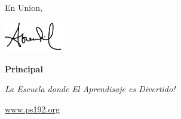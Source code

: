 \documentclass[12pt,letterpaper]{article}
\begin{document}
En Union,

\includegraphics[width=0.2\textwidth]{hil_signature}

\textbf{Principal}

\textit{La Escuela donde El Aprendisaje es Divertido!}

\url{www.ps192.org}
\end{document}
